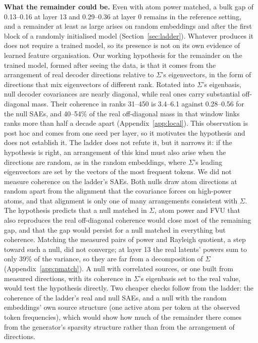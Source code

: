 \documentclass{article}
\newcommand{\Sig}{\Sigma}
\begin{document}
\textbf{What the remainder could be.} Even with atom power matched, a bulk gap of 0.13--0.16 at layer 13 and 0.29--0.36 at layer 0 remains in the reference setting, and a remainder at least as large arises on random embeddings and after the first block of a randomly initialised model (Section~\ref{sec:ladder}). Whatever produces it does not require a trained model, so its presence is not on its own evidence of learned feature organisation. Our working hypothesis for the remainder on the trained model, formed after seeing the data, is that it comes from the arrangement of real decoder directions relative to $\Sig$'s eigenvectors, in the form of directions that mix eigenvectors of different rank. Rotated into $\Sig$'s eigenbasis, null decoder covariances are nearly diagonal, while real ones carry substantial off-diagonal mass. Their coherence in ranks 31--450 is 3.4--6.1 against 0.28--0.56 for the null SAEs, and 40--54\% of the real off-diagonal mass in that window links ranks more than half a decade apart (Appendix~\ref{app:local}). This observation is post hoc and comes from one seed per layer, so it motivates the hypothesis and does not establish it. The ladder does not refute it, but it narrows it: if the hypothesis is right, an arrangement of this kind must also arise when the directions are random, as in the random embeddings, where $\Sig$'s leading eigenvectors are set by the vectors of the most frequent tokens. We did not measure coherence on the ladder's SAEs. Both nulls draw atom directions at random apart from the alignment that the covariance forces on high-power atoms, and that alignment is only one of many arrangements consistent with $\Sig$. The hypothesis predicts that a null matched in $\Sig$, atom power and FVU that also reproduces the real off-diagonal coherence would close most of the remaining gap, and that the gap would persist for a null matched in everything but coherence. Matching the measured pairs of power and Rayleigh quotient, a step toward such a null, did not converge; at layer 13 the real latents' powers sum to only 39\% of the variance, so they are far from a decomposition of $\Sig$ (Appendix~\ref{app:pmatch}). A null with correlated sources, or one built from measured directions, with its coherence in $\Sig$'s eigenbasis set to the real value, would test the hypothesis directly. Two cheaper checks follow from the ladder: the coherence of the ladder's real and null SAEs, and a null with the random embeddings' own source structure (one active atom per token at the observed token frequencies), which would show how much of the remainder there comes from the generator's sparsity structure rather than from the arrangement of directions.
\end{document}
